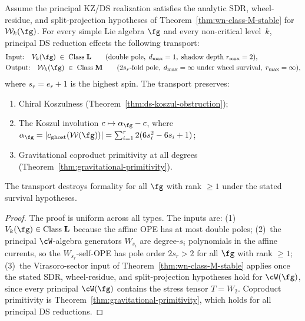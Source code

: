 \begin{proposition}
\label{prop:universal-ds-complexity}
%
Assume the principal KZ/DS realization satisfies the analytic SDR,
wheel-residue, and split-projection hypotheses of
Theorem~\textup{\ref{thm:wn-class-M-stable}} for
$\mathcal W_k(\fg)$. For every simple Lie algebra $\fg$ and every
non-critical level~$k$,
principal DS reduction effects the following transport:
\begin{align}
\label{eq:universal-transport}
&\text{Input:}\quad
V_k(\fg) \;\in\; \text{Class}\;\mathbf{L}
 \qquad(\text{double pole},\; d_{\max} = 1,\;
 \text{shadow depth } r_{\max} = 2), \\
&\text{Output:}\quad
\mathcal{W}_k(\fg) \;\in\; \text{Class}\;\mathbf{M}
 \qquad(\text{$2s_r$-fold pole},\;
 \text{$d_{\max} = \infty$ under wheel survival},\;
 r_{\max} = \infty), \notag
\end{align}
where $s_r = e_r + 1$ is the highest spin. The transport preserves:
\begin{enumerate}[label=\textup{(\alph*)}]
\item Chiral Koszulness
 \textup{(}Theorem~\textup{\ref{thm:ds-koszul-obstruction})};
\item The Koszul involution $c \mapsto \alpha_\fg - c$, where
 $\alpha_\fg = |c_{\mathrm{ghost}}(\mathcal{W}(\fg))| =
 \sum_{i=1}^r 2(6s_i^2 - 6s_i + 1)$;
\item Gravitational coproduct primitivity at all degrees
 \textup{(}Theorem~\textup{\ref{thm:gravitational-primitivity})}.
\end{enumerate}
The transport destroys formality for all $\fg$ with rank $\ge 1$ under
the stated survival hypotheses.
\end{proposition}

\begin{proof}
The proof is uniform across all types. The inputs are:
(1)~$V_k(\fg) \in \text{Class}\;\mathbf{L}$ because the affine
OPE has at most double poles;
(2)~the principal $\cW$-algebra generators $W_{s_i}$ are
degree-$s_i$ polynomials in the affine currents, so the
$W_{s_r}$-self-OPE has pole order $2s_r > 2$ for all $\fg$
with rank $\ge 1$;
(3)~the Virasoro-sector input of
Theorem~\ref{thm:wn-class-M-stable} applies once the stated SDR,
wheel-residue, and split-projection hypotheses hold for
$\cW(\fg)$, since every principal $\cW(\fg)$ contains the stress
tensor $T = W_2$.
Coproduct primitivity is
Theorem~\ref{thm:gravitational-primitivity}, which holds for
all principal DS reductions.
\end{proof}

